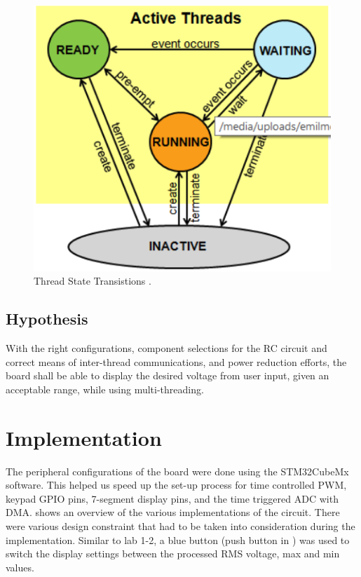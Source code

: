 \documentclass[a4paper,titlepage]{article}
\begin{document}
\begin{figure}[!htb]
  \centering
  \includegraphics[width=\columnwidth]{figures/active_threads.png}
  \caption{Thread State Transistions \cite{lab4_tutorial}.}
  \label{fig:active_threads}
\end{figure}

\subsection{Hypothesis}

With the right configurations, component selections for the RC circuit and correct means of inter-thread communications, and power reduction efforts, the board shall be able to display the desired voltage from user input, given an acceptable range, while using multi-threading.


\section{Implementation}
The peripheral configurations of the board were done using the STM32CubeMx software. This helped us speed up the set-up process for time controlled PWM, keypad GPIO pins, 7-segment display pins, and the time triggered ADC with DMA.  shows an overview of the various implementations of the circuit. There were various design constraint that had to be taken into consideration during the implementation.  Similar to lab 1-2, a blue button (push button in ) was used to switch the display settings between the processed RMS voltage, max and min values.
\end{document}

